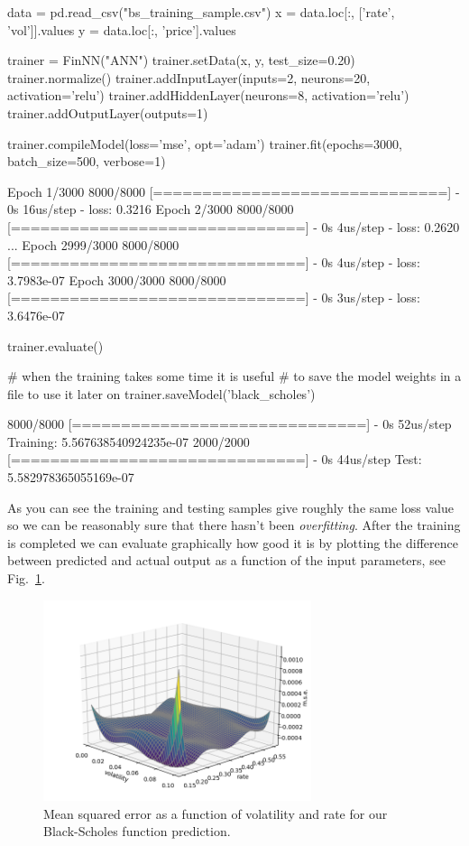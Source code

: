 \begin{ipython}
data = pd.read_csv("bs_training_sample.csv")
x = data.loc[:, ['rate', 'vol']].values
y = data.loc[:, 'price'].values

trainer = FinNN("ANN")
trainer.setData(x, y, test_size=0.20)
trainer.normalize()
trainer.addInputLayer(inputs=2, neurons=20, activation='relu')
trainer.addHiddenLayer(neurons=8, activation='relu')
trainer.addOutputLayer(outputs=1)

trainer.compileModel(loss='mse', opt='adam')
trainer.fit(epochs=3000, batch_size=500, verbose=1)
\end{ipython}
\begin{ioutput}
Epoch 1/3000
8000/8000 [==============================] - 0s 16us/step - loss: 0.3216
Epoch 2/3000
8000/8000 [==============================] - 0s 4us/step - loss: 0.2620
...
Epoch 2999/3000
8000/8000 [==============================] - 0s 4us/step - loss: 3.7983e-07
Epoch 3000/3000
8000/8000 [==============================] - 0s 3us/step - loss: 3.6476e-07
\end{ioutput}
\begin{ipython}
trainer.evaluate()

# when the training takes some time it is useful
# to save the model weights in a file to use it later on
trainer.saveModel('black_scholes')
\end{ipython}
\begin{ioutput}
8000/8000 [==============================] - 0s 52us/step
Training: 5.567638540924235e-07
2000/2000 [==============================] - 0s 44us/step
Test: 5.582978365055169e-07
\end{ioutput}

As you can see the training and testing samples give roughly the same loss value so we can be reasonably sure that there hasn't been \emph{overfitting}.
After the training is completed we can evaluate graphically how good it is by plotting the difference between predicted and actual output as a function of the input parameters, see Fig.~\ref{fig:vol_rate}. 

\begin{figure}[htb]
\centering
\includegraphics[width=0.7\textwidth]{figures/vol_rate}
\caption{Mean squared error as a function of volatility and rate for our Black-Scholes function prediction.}
\label{fig:vol_rate}
\end{figure}


